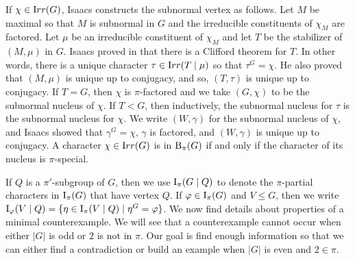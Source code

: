 \documentclass[12pt]{article}
\def\irr#1{{\textrm  Irr}(#1)}
\def\B#1#2{{\textrm B}_{#1} (#2)}
\def\Bpi#1{\B {\pi}{#1}}
\def\I#1#2{{\textrm I}_{#1} (#2)}
\def\Ipi#1{\I {\pi}{#1}}
\def\phi{\varphi}
\newcommand \IIpi[3] {{\textrm I}_{#1} (#2 \mid #3)}
\begin{document}

If $\chi \in \irr G$, Isaacs constructs the subnormal vertex as
follows.  Let $M$ be maximal so that $M$ is subnormal in $G$ and the
irreducible constituents of $\chi_M$ are factored.  Let $\mu$ be an
irreducible constituent of $\chi_M$ and let $T$ be the stabilizer of
$(M,\mu)$ in $G$.  Isaacs proved in \cite{pisep} that there is a
Clifford theorem for $T$.  In other words, there is a unique
character $\tau \in \irr {T \mid \mu}$ so that $\tau^G = \chi$.  He
also proved that $(M,\mu)$ is unique up to conjugacy, and so,
$(T,\tau)$ is unique up to conjugacy.  If $T = G$, then $\chi$ is
$\pi$-factored and we take $(G,\chi)$ to be the subnormal nucleus of
$\chi$.  If $T < G$, then inductively, the subnormal nucleus for
$\tau$ is the subnormal nucleus for $\chi$.  We write $(W,\gamma)$
for the subnormal nucleus of $\chi$, and Isaacs showed that
$\gamma^G = \chi$, $\gamma$ is factored, and $(W,\gamma)$ is unique
up to conjugacy.  A character $\chi \in \irr G$ is in $\Bpi G$ if
and only if the character of its nucleus is $\pi$-special.

If $Q$ is a $\pi'$-subgroup of $G$, then we use $\Ipi {G \mid Q}$ to
denote the $\pi$-partial characters in $\Ipi G$ that have vertex
$Q$.  If $\phi \in \Ipi G$ and $V \le G$, then we write $\IIpi
{\phi}VQ = \{ \eta \in \Ipi {V \mid Q} \mid \eta^G = \phi \}$.  We
now find details about properties of a minimal counterexample.  We
will see that a counterexample cannot occur when either $|G|$ is odd
or $2$ is not in $\pi$.  Our goal is find enough information so that
we can either find a contradiction or build an example when $|G|$ is
even and $2 \in \pi$.
\end{document}
